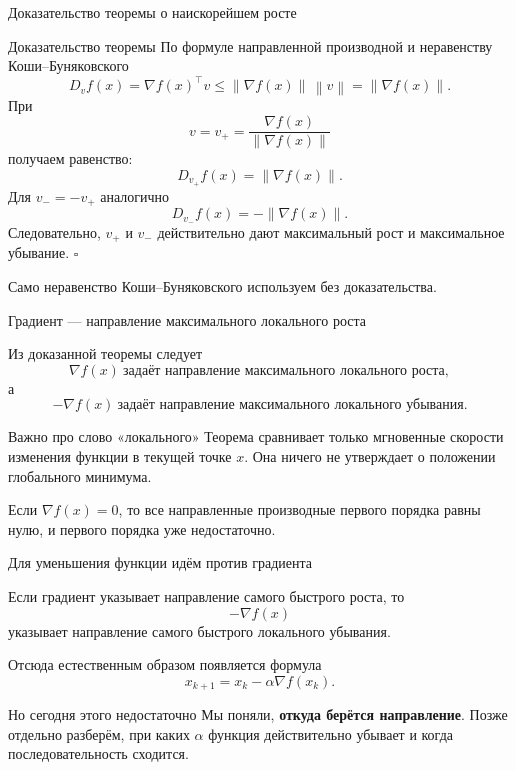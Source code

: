 \documentclass[aspectratio=169,10pt]{beamer}
\newcommand{\norm}[1]{\left\lVert #1\right\rVert}
\newcommand{\grad}{\nabla}
\begin{document}
\begin{frame}{Доказательство теоремы о наискорейшем росте}
\small
\vspace{0.10em}

\begin{block}{Доказательство теоремы}
По формуле направленной производной и неравенству Коши--Буняковского
\[
  D_vf(x)=\grad f(x)^\top v
  \le \norm{\grad f(x)}\,\norm{v}
  =\norm{\grad f(x)}.
\]
При
\[
  v=v_+=\frac{\grad f(x)}{\norm{\grad f(x)}}
\]
получаем равенство:
\[
  D_{v_+}f(x)=\norm{\grad f(x)}.
\]
Для $v_-=-v_+$ аналогично
\[
  D_{v_-}f(x)=-\norm{\grad f(x)}.
\]
Следовательно, $v_+$ и $v_-$ действительно дают максимальный рост и максимальное убывание. $\square$
\end{block}

\small
Само неравенство Коши--Буняковского используем без доказательства.
\end{frame}

\begin{frame}{Градиент --- направление максимального локального роста}
\vspace{0.35em}

Из доказанной теоремы следует
\[
  \boxed{
  \grad f(x)\ \text{задаёт направление максимального локального роста},
  }
\]
а
\[
  \boxed{
  -\grad f(x)\ \text{задаёт направление максимального локального убывания}.
  }
\]

\begin{block}{Важно про слово «локального»}
Теорема сравнивает только мгновенные скорости изменения функции в текущей точке $x$. Она ничего не утверждает о положении глобального минимума.
\end{block}

\small
Если $\grad f(x)=0$, то все направленные производные первого порядка равны нулю, и первого порядка уже недостаточно.
\end{frame}

\begin{frame}{Для уменьшения функции идём против градиента}
\vspace{0.55em}

Если градиент указывает направление самого быстрого роста, то
\[
  -\grad f(x)
\]
указывает направление самого быстрого локального убывания.

\vspace{0.4em}

Отсюда естественным образом появляется формула
\[
  \boxed{x_{k+1}=x_k-\alpha\grad f(x_k).}
\]

\begin{block}{Но сегодня этого недостаточно}
Мы поняли, \textbf{откуда берётся направление}. Позже отдельно разберём, при каких $\alpha$ функция действительно убывает и когда последовательность сходится.
\end{block}

\end{frame}
\end{document}
